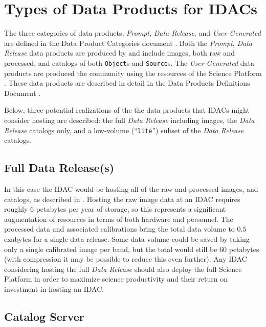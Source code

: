 \section{Types of Data Products for IDACs}\label{sec:data}

The three categories of \RO data products, {\it Prompt}, {\it \gls{Data Release}}, and {\it User Generated} are defined in the \RO \gls{Data Product} Categories document  .
Both the {\it Prompt}, {\it \gls{Data Release}} data products are produced by \RO and include images, both raw and processed, and catalogs of both {\tt Object}s and {\tt \gls{Source}}s.
The  {\it User Generated} data products are produced the community using the resources of the \RO \gls{Science Platform} .
These data products are described in detail in the Data Products Definitions \gls{Document} .

Below, three potential realizations of the the  data products that IDACs might consider hosting are described: the full {\it \gls{Data Release}} including images, the {\it \gls{Data Release}} catalogs only, and a low-volume (``{\tt lite}'') subset of the {\it \gls{Data Release}} catalogs.

\subsection{Full \gls{Data Release}(s)}

In this case the \gls{IDAC} would be hosting all of the raw and processed images, and catalogs, as described in . Hosting the raw image data at an \gls{IDAC} requires roughly $6$ petabytes per year of storage, so this represents a significant augmentation of resources in terms of both hardware and personnel. The processed data and associated calibrations bring the total data volume to $0.5$ exabytes for a single data release. Some data volume could be saved by taking only a single calibrated image per band, but the total would still be $60$ petabytes (with compression it may be possible to reduce this even further). Any \gls{IDAC} considering hosting the full {\it Data Release} should also deploy the full \RO \gls{Science Platform}  in order to maximize science productivity and their return on investment in hosting an \gls{IDAC}.

\subsection{Catalog Server}

